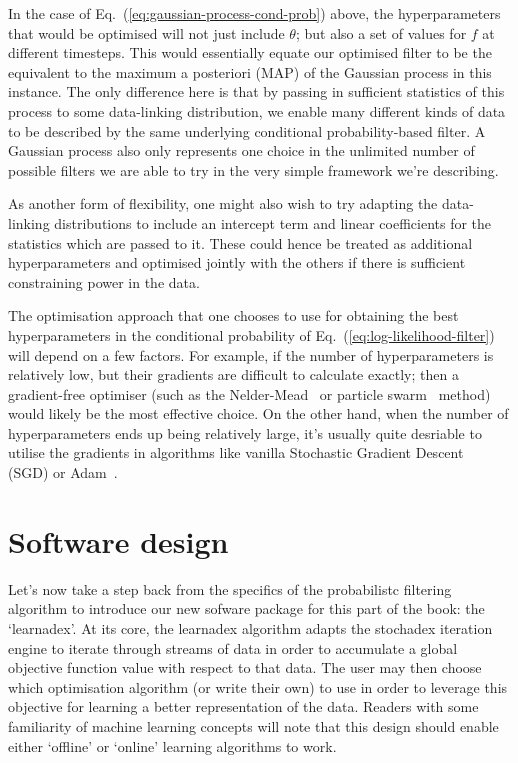 In the case of Eq.~(\ref{eq:gaussian-process-cond-prob}) above, the hyperparameters that would be optimised will not just include $\theta$; but also a set of values for $f$ at different timesteps. This would essentially equate our optimised filter to be the equivalent to the maximum a posteriori (MAP) of the Gaussian process in this instance. The only difference here is that by passing in sufficient statistics of this process to some data-linking distribution, we enable many different kinds of data to be described by the same underlying conditional probability-based filter. A Gaussian process also only represents one choice in the unlimited number of possible filters we are able to try in the very simple framework we're describing. 

As another form of flexibility, one might also wish to try adapting the data-linking distributions to include an intercept term and linear coefficients for the statistics which are passed to it. These could hence be treated as additional hyperparameters and optimised jointly with the others if there is sufficient constraining power in the data.

The optimisation approach that one chooses to use for obtaining the best hyperparameters in the conditional probability of Eq.~(\ref{eq:log-likelihood-filter}) will depend on a few factors. For example, if the number of hyperparameters is relatively low, but their gradients are difficult to calculate exactly; then a gradient-free optimiser (such as the Nelder-Mead~\cite{nelder1965simplex} or particle swarm~\cite{kennedy1995particle, shi1998modified} method) would likely be the most effective choice. On the other hand, when the number of hyperparameters ends up being relatively large, it's usually quite desriable to utilise the gradients in algorithms like vanilla Stochastic Gradient Descent~\cite{robbins1951stochastic} (SGD) or Adam~\cite{kingma2014adam}.

\section{\sffamily Software design}

Let's now take a step back from the specifics of the probabilistc filtering algorithm to introduce our new sofware package for this part of the book: the `learnadex'. At its core, the learnadex algorithm adapts the stochadex iteration engine to iterate through streams of data in order to accumulate a global objective function value with respect to that data. The user may then choose which optimisation algorithm (or write their own) to use in order to leverage this objective for learning a better representation of the data. Readers with some familiarity of machine learning concepts will note that this design should enable either `offline' or `online' learning algorithms to work.

